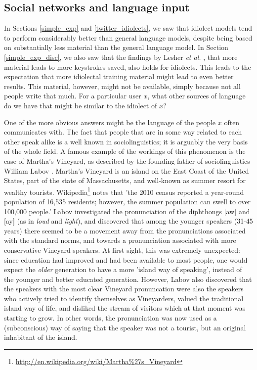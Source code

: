 \documentclass[11pt]{article}
\begin{document}
\subsection{Social networks and language input} \label{input_networks}

In Sections \ref{simple_exp} and \ref{twitter_idiolects}, we saw that idiolect models tend to perform considerably better than general language models, despite being based on substantially less material than the general language model. In Section \ref{simple_exp_disc}, we also saw that the findings by Lesher {\em et al.} , that more material leads to more keystrokes saved, also holds for idiolects. This leads to the expectation that more idiolectal training material might lead to even better results. This material, however, might not be available, simply because not all people write that much. For a particular user $x$, what other sources of language do we have that might be similar to the idiolect of $x$?

One of the more obvious answers might be the language of the people $x$ often communicates with. The fact that people that are in some way related to each other speak alike is a well known in sociolinguistics; it is arguably the very basis of the whole field. A famous example of the workings of this phenomenon is the case of Martha's Vineyard, as described by the founding father of sociolinguistics William Labov \cite{labov63}. Martha's Vineyard is an island on the East Coast of the United States, part of the state of Massachusetts, and well-known as summer resort for wealthy tourists. Wikipedia\footnote{\url{http://en.wikipedia.org/wiki/Martha\%27s\_Vineyard}} notes that 'the 2010 census reported a year-round population of 16,535 residents; however, the summer population can swell to over 100,000 people.' Labov investigated the pronunciation of the diphthongs [aw] and [ay] (as in \emph{loud} and \emph{light}), and discovered that among the younger speakers (31-45 years) there seemed to be a movement away from the pronunciations associated with the standard norms, and towards a pronunciation associated with more conservative  Vineyard speakers. At first sight, this was extremely unexpected: since education had improved and had been available to most people, one would expect the \emph{older} generation to have a more 'island way of speaking', instead of the younger and better educated generation. However, Labov also discovered that the speakers with the most clear Vineyard pronuncation were also the speakers who actively tried to identify themselves as Vineyarders, valued the traditional island way of life, and disliked the stream of visitors which at that moment was starting to grow. In other words, the pronunciation was now used as a (subconscious) way of saying that the speaker was not a tourist, but an original inhabitant of the island.
\end{document}
